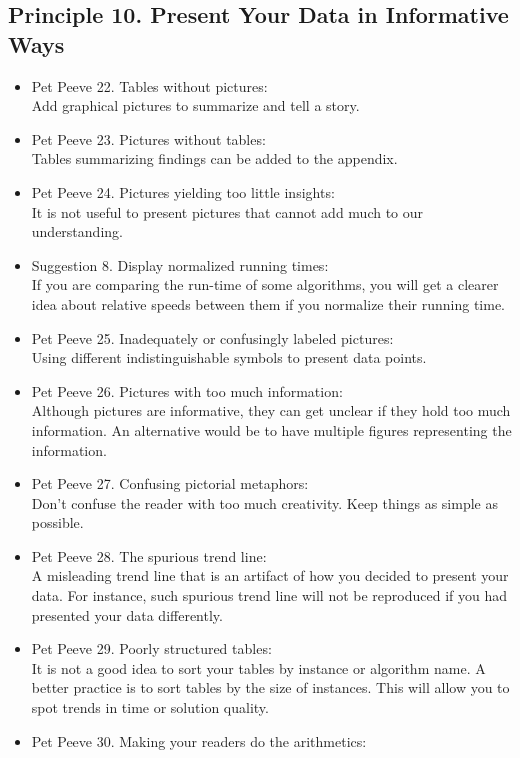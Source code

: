\documentclass[]{scrartcl}
\begin{document}
\subsection*{Principle 10. Present Your Data in Informative Ways}
\begin{itemize}
	\item Pet Peeve 22. Tables without pictures: \\
	Add graphical pictures to summarize and tell a story.
	\item Pet Peeve 23. Pictures without tables: \\ 
	Tables summarizing findings can be added to the appendix.
	\item Pet Peeve 24. Pictures yielding too little insights: \\
	It is not useful to present pictures that cannot add much to our understanding.
	\item Suggestion 8. Display normalized running times: \\
	If you are comparing the run-time of some algorithms, you will get a clearer idea about relative speeds between them if you normalize their running time.
	\item Pet Peeve 25. Inadequately or confusingly labeled pictures: \\
	Using different indistinguishable symbols to present data points.
	\item Pet Peeve 26. Pictures with too much information: \\
	Although pictures are informative, they can get unclear if they hold too much information. An alternative would be to have multiple figures representing the information.
	\item Pet Peeve 27. Confusing pictorial metaphors: \\
	Don't confuse the reader with too much creativity. Keep things as simple as possible.
	\item Pet Peeve 28. The spurious trend line: \\
	A misleading trend line that is an artifact of how you decided to present your data. For instance, such spurious trend line will not be reproduced if you had presented your data differently.
	\item Pet Peeve 29. Poorly structured tables: \\
	It is not a good idea to sort your tables by instance or algorithm name. A better practice is to sort tables by the size of instances. This will allow you to spot trends in time or solution quality.
	\item Pet Peeve 30. Making your readers do the arithmetics: \\

\end{itemize}
\end{document}
